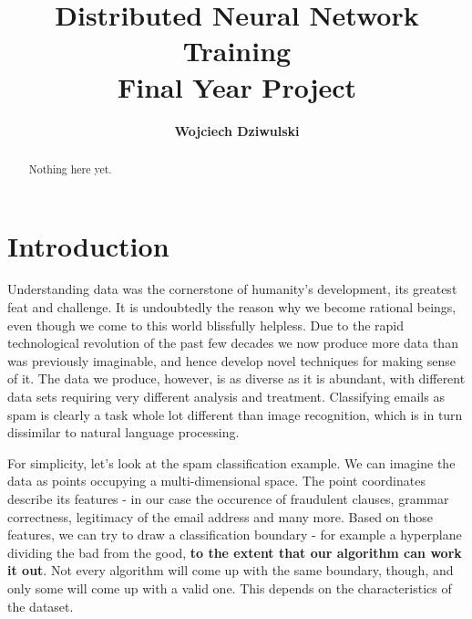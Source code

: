 \documentclass[a4paper, 11pt]{article}
\title{Distributed Neural Network Training \\ \large Final Year Project}
\author{\textbf{Wojciech Dziwulski}}
\date{}
\numberwithin{equation}{section}
\begin{document}
	
	\clearpage
	\maketitle
	\thispagestyle{empty}
	\begin{abstract}
		 Nothing here yet.
		
	\end{abstract}
	
	
	\newpage
	\tableofcontents 
	
	
	\newpage
	
	
	\clearpage
	

		\newpage
		
		\clearpage
			
		\pagestyle{wojciech}
		
		\section{Introduction}
		
		Understanding data was the cornerstone of humanity's development, its greatest feat and challenge. It is undoubtedly the reason why we become rational beings, even though we come to this world blissfully helpless. Due to the rapid technological revolution of the past few decades we now produce more data than was previously imaginable, and hence develop novel techniques for making sense of it. The data we produce, however, is as diverse as it is abundant, with different data sets requiring very different analysis and treatment. Classifying emails as spam is clearly a task whole lot different than image recognition, which is in turn dissimilar to natural language processing.
		
		For simplicity, let's look at the spam classification example. We can imagine the data as points occupying a multi-dimensional space. The point coordinates describe its features - in our case the occurence of fraudulent clauses, grammar correctness, legitimacy of the email address and many more. Based on those features, we can try to draw a classification boundary - for example a hyperplane dividing the bad from the good, \textbf{to the extent that our algorithm can work it out}. Not every algorithm will come up with the same boundary, though, and only some will come up with a valid one. This depends on the characteristics of the dataset.
		
\end{document}
